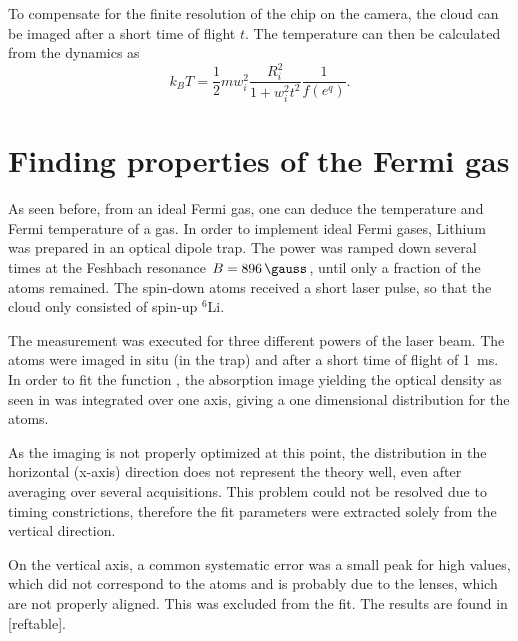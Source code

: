 To compensate for the finite resolution of the chip on the camera, the cloud can be imaged after a short time of flight $t$. The temperature can then be calculated from the dynamics as
\begin{equation}
k_BT = \frac{1}{2} mw_i^2 \frac{R_i^2}{1+w_i^2t^2}\frac{1}{f(e^q)}.
\end{equation}


	
\section{Finding properties of the Fermi gas}

As seen before, from an ideal Fermi gas, one can deduce the temperature and Fermi temperature of a gas.
In order to implement ideal Fermi gases, Lithium was prepared in an optical dipole trap. The power was ramped down several times at the Feshbach resonance $B=\SI{896}{\gauss}$, until only a fraction of the atoms remained. The spin-down atoms received a short laser pulse, so that the cloud only consisted of spin-up $^6$Li.


The measurement was executed for three different powers of the laser beam. The atoms were imaged in situ (in the trap) and after a short time of flight of \SI{1}{\milli\second}. In order to fit the function , the absorption image yielding the optical density as seen in  was integrated over one axis, giving a one dimensional distribution for the atoms.

As the imaging is not properly optimized at this point, the distribution in the horizontal (x-axis) direction does not represent the theory well, even after averaging over several acquisitions. This problem could not be resolved due to timing constrictions, therefore the fit parameters were extracted solely from the vertical direction.

On the vertical axis, a common systematic error was a small peak for high values, which did not correspond to the atoms and is probably due to the lenses, which are not properly aligned. This was excluded from the fit. The results are found in [reftable].